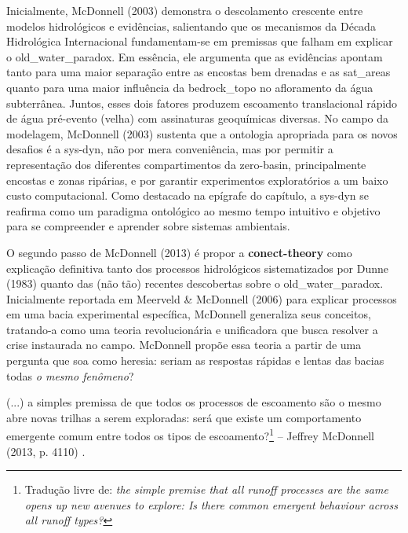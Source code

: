 \documentclass[./main.tex]{subfiles}
\begin{document}
\par Inicialmente, McDonnell (2003) demonstra o descolamento crescente entre modelos hidrológicos e evidências, salientando que os mecanismos da Década Hidrológica Internacional fundamentam-se em premissas que falham em explicar o \gls{old_water_paradox}. Em essência, ele argumenta que as evidências apontam tanto para uma maior separação entre as encostas bem drenadas e as \gls{sat_areas} quanto para uma maior influência da \gls{bedrock_topo} no afloramento da água subterrânea. Juntos, esses dois fatores produzem escoamento translacional rápido de água pré-evento (velha) com assinaturas geoquímicas diversas. No campo da modelagem, McDonnell (2003) sustenta que a ontologia apropriada para os novos desafios é a \gls{sys-dyn}, não por mera conveniência, mas por permitir a representação dos diferentes compartimentos da \gls{zero-basin}, principalmente encostas e zonas ripárias, e por garantir experimentos exploratórios a um baixo custo computacional. Como destacado na epígrafe do capítulo, a \gls{sys-dyn} se reafirma como um \gls{paradigma} ontológico ao mesmo tempo intuitivo e objetivo para se compreender e aprender sobre sistemas ambientais.

\par O segundo passo de McDonnell (2013) é propor a \textbf{\gls{conect-theory}} como explicação definitiva tanto dos processos hidrológicos sistematizados por Dunne (1983) quanto das (não tão) recentes descobertas sobre o \gls{old_water_paradox}. Inicialmente reportada em Meerveld \& McDonnell (2006) \cite{Meerveld2006b} para explicar processos em uma bacia experimental específica, McDonnell generaliza seus conceitos, tratando-a como uma \gls{teoria} revolucionária e unificadora que busca resolver a crise instaurada no campo. McDonnell propõe essa \gls{teoria} a partir de uma pergunta que soa como heresia: seriam as respostas rápidas e lentas das bacias todas \textit{o mesmo fenômeno}?

\begin{adjustwidth}{100pt}{0pt}
\medskip
\small (...) a simples premissa de que todos os processos de escoamento são o mesmo abre novas trilhas a serem exploradas: será que existe um comportamento emergente comum entre todos os tipos de escoamento?\footnote{Tradução livre de: \textit{the simple premise that all runoff processes are the same opens up new avenues to explore: Is there common emergent behaviour across all runoff types?}} -- Jeffrey McDonnell (2013, p. 4110) \cite{Mcdonnell2013}.
\medskip
\end{adjustwidth}
\end{document}
